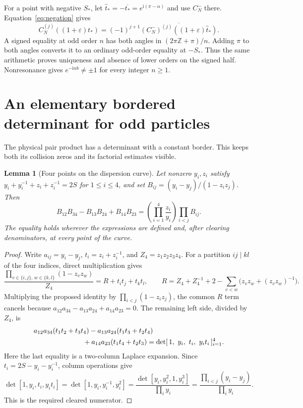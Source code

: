 \documentclass[11pt]{article}
\numberwithin{equation}{section}
\newtheorem{lemma}[theorem]{Lemma}
\theoremstyle{remark}\newtheorem{remark}[theorem]{Remark}
\newcommand{\ii}{\mathrm i}
\begin{document}
For a point with negative $S_*$, let
$\widehat t_*=-\overline{t_*}=e^{\ii(\pi-\alpha)}$ and use
$C_N^-$ there. Equation~\eqref{eq:negation} gives
\begin{equation}\label{eq:negative-derivatives}
 C_N^{(j)}((1+\varepsilon)t_*)
   =(-1)^{j+1}\overline{(C_N^-)^{(j)}((1+\varepsilon)\widehat t_*)}.
\end{equation}
A signed equality at odd order $n$ has both angles in
$(2\pi\mathbb Z+\pi)/n$. Adding $\pi$ to both angles
converts it to an ordinary odd-order equality at $-S_*$.
Thus the same arithmetic proves uniqueness and absence of lower
orders on the signed half. Nonresonance gives
$e^{-\ii nb}\ne\pm1$ for every integer $n\ge1$.

\section{An elementary bordered determinant for odd particles}
\label{sec:elementary-pfaffian}\label{sec:determinant-local}
The physical pair product has a determinant with a constant border.
This keeps both its collision zeros and its factorial estimates visible.
\begin{lemma}[Four points on the dispersion curve]
Let nonzero $y_i,z_i$ satisfy
$y_i+y_i^{-1}+z_i+z_i^{-1}=2S$ for $1\le i\le4$, and set
$B_{ij}=(y_i-y_j)/(1-z_i z_j)$.  Then
\[
 B_{12}B_{34}-B_{13}B_{24}+B_{14}B_{23}
 =\left(\prod_{i=1}^4\frac{z_i}{y_i}\right)
   \prod_{i<j}B_{ij}.
\]
The equality holds wherever the expressions are defined and,
after clearing denominators, at every point of the curve.
\end{lemma}
\begin{proof}
Write $a_{ij}=y_i-y_j$, $t_i=z_i+z_i^{-1}$, and
$Z_4=z_1z_2z_3z_4$.  For a partition $ij\mid kl$ of the four
indices, direct multiplication gives
\[
 \frac{\prod_{v\in\{i,j\},\,w\in\{k,l\}}(1-z_vz_w)}{Z_4}
 =R+t_it_j+t_kt_l,
 \qquad
 R=Z_4+Z_4^{-1}+2-\sum_{v<w}
          \bigl(z_vz_w+(z_vz_w)^{-1}\bigr).
\]
Multiplying the proposed identity by
$\prod_{i<j}(1-z_i z_j)$, the common $R$ term cancels because
$a_{12}a_{34}-a_{13}a_{24}+a_{14}a_{23}=0$.
The remaining left side, divided by $Z_4$, is
\[
 \begin{split}
 &a_{12}a_{34}(t_1t_2+t_3t_4)
 -a_{13}a_{24}(t_1t_3+t_2t_4)\\
 &\hspace{25mm}+a_{14}a_{23}(t_1t_4+t_2t_3)
 =\det[\,1,\ y_i,\ t_i,\ y_it_i\,]_{i=1}^4.
 \end{split}
\]
Here the last equality is a two-column Laplace expansion.
Since $t_i=2S-y_i-y_i^{-1}$, column operations give
\[
 \det[1,y_i,t_i,y_it_i]
 =\det[1,y_i,y_i^{-1},y_i^2]
 =\frac{\det[y_i,y_i^2,1,y_i^3]}{\prod_i y_i}
 =\frac{\prod_{i<j}(y_i-y_j)}{\prod_i y_i}.
\]
This is the required cleared numerator.
\end{proof}
\end{document}
